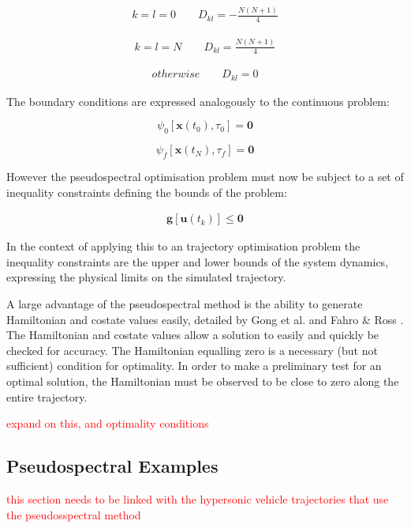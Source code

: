 \begin{eqnarray}
k = l = 0\qquad
D_{kl} = - \frac{N(N+1)}{4} 
\end{eqnarray}

\begin{eqnarray}
k = l = N\qquad
D_{kl} = \frac{N(N+1)}{4} 
\end{eqnarray}

\begin{eqnarray}
otherwise \qquad
D_{kl} = 0
\end{eqnarray}

The boundary conditions are expressed analogously to the continuous problem:

\begin{equation}
\psi_0[\textbf{x}(t_0), \tau_0] = \textbf{0}
\end{equation}

\begin{equation}
\psi_f[\textbf{x}(t_N), \tau_f] = \textbf{0}
\end{equation}

However the pseudospectral optimisation problem must now be subject to a set of inequality constraints defining the bounds of the problem:

\begin{eqnarray}
\textbf{g}[\textbf{u}(t_k)] \leq \textbf{0}
\end{eqnarray}

In the context of applying this to an trajectory optimisation problem the inequality constraints are the upper and lower bounds of the system dynamics, expressing the physical limits on the simulated trajectory. 

A large advantage of the pseudospectral method is the ability to generate Hamiltonian and costate values easily, detailed by Gong et al. \cite{Gong2010} and Fahro \& Ross \cite{Fahroo2001}. The Hamiltonian and costate values allow a solution to easily and quickly be checked for accuracy.  The Hamiltonian equalling zero is a necessary (but not sufficient) condition for optimality. In order to make a preliminary test for an optimal solution, the Hamiltonian must be observed to be close to zero along the entire trajectory. 

\textcolor{red}{expand on this, and optimality conditions}

\subsection{Pseudospectral Examples}
\textcolor{red}{this section needs to be linked with the hypersonic vehicle trajectories that use the pseudosspectral method}

